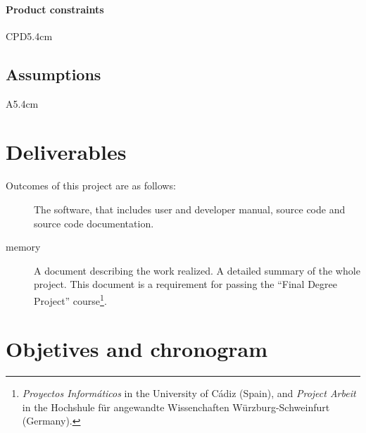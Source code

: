 \documentclass[twocolumn]{article}
\begin{document}
\paragraph{Product constraints}
\begin{condlist}{CPD}{5.4cm}
\end{condlist}

\subsection{Assumptions}
\begin{condlist}{A}{5.4cm}
\end{condlist}

\section{Deliverables}
Outcomes of this project are as follows:

\begin{description}
  \item[\fav] The \fav software, that includes user and developer
    manual, source code and source code documentation.
  \item[\favp memory] A document describing the work realized. A
    detailed summary of the whole project. This document is a
    requirement for passing the ``Final Degree Project''
    course\footnote{\textit{Proyectos Informáticos} in the University
      of Cádiz (Spain), and \textit{Project Arbeit} in the Hochshule
      für angewandte Wissenchaften Würzburg-Schweinfurt (Germany).}.
\end{description}

\section{Objetives and chronogram}
\end{document}
